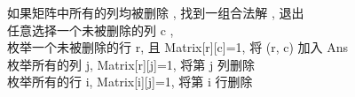 
如果矩阵中所有的列均被删除 , 找到一组合法解 , 退出 \\
任意选择一个未被删除的列 c , \\
枚举一个未被删除的行 r, 且 Matrix[r][c]=1, 将 (r, c) 加入 Ans \\
枚举所有的列 j, Matrix[r][j]=1, 将第 j 列删除\\
枚举所有的行 i, Matrix[i][j]=1, 将第 i 行删除



\inputminted{cpp}{src/DancingLinks.cpp}
